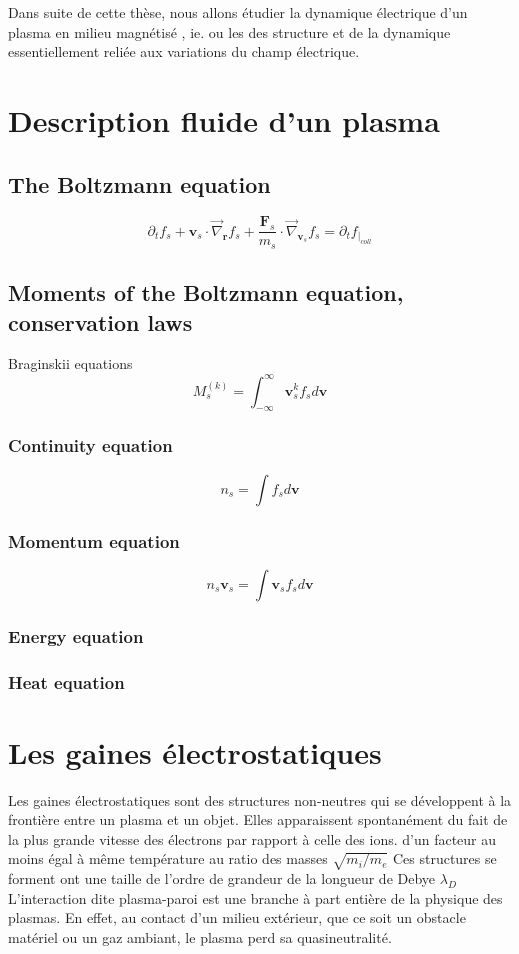 			
			Dans suite de cette thèse, nous allons étudier la dynamique électrique d'un plasma en milieu magnétisé
			, ie. ou les 
			des structure et de la dynamique essentiellement reliée aux variations du champ électrique.
	\section{Description fluide d'un plasma}
		
		\subsection{The Boltzmann equation}
			$$\partial_tf_s+\mathbf{v}_s\cdot\vec\nabla_\mathbf{r}f_s+\frac{\mathbf{F}_s}{m_s}\cdot\vec\nabla_{\mathbf{v}_s}f_s=\partial_tf_{|_{coll}}$$
		\subsection{Moments of the Boltzmann equation, conservation laws}
			Braginskii equations
			$$M^{(k)}_s=\int_{-\infty}^{\infty}\mathbf{v}_s^kf_sd\mathbf{v}$$
			\subsubsection{Continuity equation}
			$$n_s=\int f_sd\mathbf{v}$$
			
			\subsubsection{Momentum equation}
			$$n_s\mathbf{v}_s=\int \mathbf{v}_sf_sd\mathbf{v}$$
			\subsubsection{Energy equation}
			\subsubsection{Heat equation}
	\section{Les gaines électrostatiques}
			Les gaines électrostatiques sont des structures non-neutres qui se
			développent à la frontière entre un plasma et un objet. Elles apparaissent
			spontanément du fait de la plus grande vitesse des électrons par rapport à
			celle des ions.  d'un facteur au moins égal à même température au ratio des
			masses $\sqrt{m_i/m_e}$ Ces structures se forment ont une taille de l'ordre de grandeur de la longueur de Debye $\lambda_D$
			L'interaction dite plasma-paroi est une branche à part entière de la physique des plasmas.
			En effet, au contact d'un milieu extérieur, que ce soit un obstacle matériel
			ou un gaz ambiant, le plasma perd sa quasineutralité.
